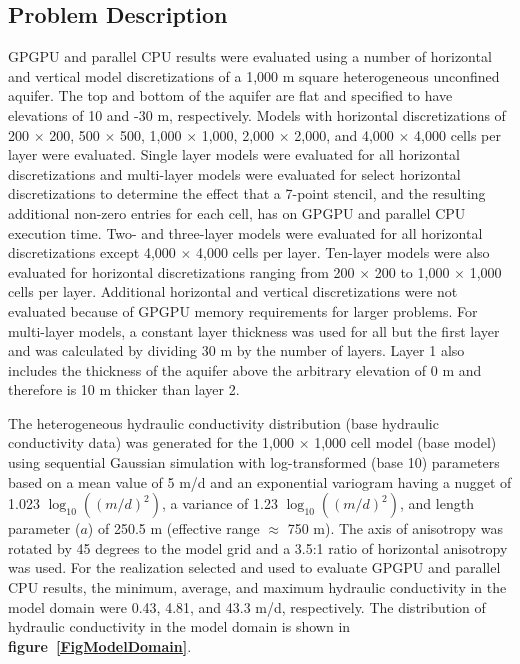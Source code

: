 \documentclass[12pt]{article}
\begin{document}
\subsection*{Problem Description}
GPGPU and parallel CPU results were evaluated using a number of horizontal and vertical model discretizations of a 1,000 m square heterogeneous unconfined aquifer. The top and bottom of the aquifer are flat and specified to have elevations of 10 and -30 m, respectively. Models with horizontal discretizations of 200 $\times$ 200, 500 $\times$ 500, 1,000 $\times$ 1,000, 2,000 $\times$ 2,000, and 4,000 $\times$ 4,000 cells per layer were evaluated. Single layer models were evaluated for all horizontal discretizations and multi-layer models were evaluated for select horizontal discretizations to determine the effect that a 7-point stencil, and the resulting additional non-zero entries for each cell, has on GPGPU and parallel CPU execution time. Two- and three-layer models were evaluated for all horizontal discretizations except 4,000 $\times$ 4,000 cells per layer. Ten-layer models were also evaluated for horizontal discretizations ranging from 200 $\times$ 200 to 1,000 $\times$ 1,000 cells per layer. Additional horizontal and vertical discretizations were not evaluated because of GPGPU memory requirements for larger problems. For multi-layer models, a constant layer thickness was used for all but the first layer and was calculated by dividing 30 m by the number of layers. \color{blue}Layer 1 also includes the thickness of the aquifer above the arbitrary elevation of 0 m and therefore is 10 m thicker than layer 2.\color{black}

The heterogeneous hydraulic conductivity distribution (base hydraulic conductivity data) was generated for the 1,000 $\times$ 1,000 cell model (base model) using sequential Gaussian simulation with log-transformed (base 10) parameters based on a mean value of 5 m/d and an exponential variogram having a nugget of 1.023 $\log_{10}((m/d)^{2})$, a variance of 1.23 $\log_{10}((m/d)^{2})$, and length parameter ($a$) of 250.5 m (effective range $\approx$ 750 m). The axis of anisotropy was rotated by 45 degrees to the model grid and a 3.5:1 ratio of horizontal anisotropy was used. For the realization selected and used to evaluate GPGPU and parallel CPU results, the minimum, average, and maximum hydraulic conductivity in the model domain were 0.43, 4.81, and 43.3 m/d, respectively. The distribution of hydraulic conductivity in the model domain is shown in \textbf{figure~\ref{FigModelDomain}}.
\end{document}
